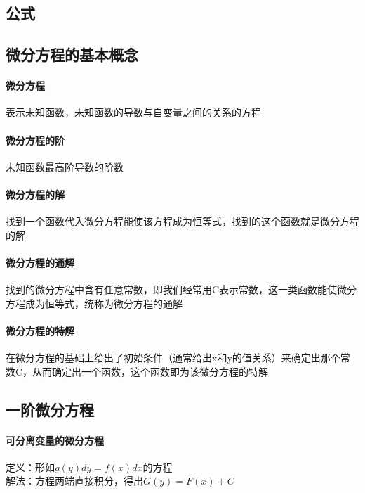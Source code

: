 \documentclass{article}
\begin{document}
\begin{flushleft}
	\LARGE
	
	\section{公式}
	
	\subsection{微分方程的基本概念}
	
	\paragraph{微分方程}\qquad 
	表示未知函数，未知函数的导数与自变量之间的关系的方程\\
	\paragraph{微分方程的阶}
	未知函数最高阶导数的阶数\\
	\paragraph{微分方程的解}
	找到一个函数代入微分方程能使该方程成为恒等式，找到的这个函数就是微分方程的解\\
	\paragraph{微分方程的通解}
	找到的微分方程中含有任意常数，即我们经常用C表示常数，这一类函数能使微分方程成为恒等式，统称为微分方程的通解\\
	\paragraph{微分方程的特解}
	在微分方程的基础上给出了初始条件（通常给出x和y的值关系）来确定出那个常数C，从而确定出一个函数，这个函数即为该微分方程的特解\\
	
	\subsection{一阶微分方程}
	
	 \paragraph{可分离变量的微分方程}
	 定义：形如$g(y)dy=f(x)dx$的方程\\
	 解法：方程两端直接积分，得出$G(y)=F(x)+C$\\
	 

\end{flushleft}
\end{document}
